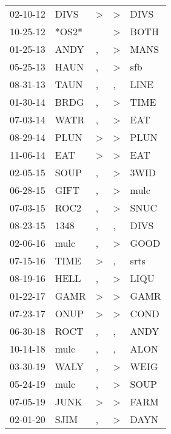 \begin{supertabular}{lllll}
 02-10-12 &   DIVS &  \textgreater &     \textgreater &  DIVS \\
 10-25-12 &  *OS2* &               &     \textgreater &  BOTH \\
 01-25-13 &   ANDY &             , &     \textgreater &  MANS \\
 05-25-13 &   HAUN &             , &     \textgreater &   sfb \\
 08-31-13 &   TAUN &             , &                , &  LINE \\
 01-30-14 &   BRDG &             , &     \textgreater &  TIME \\
 07-03-14 &   WATR &             , &     \textgreater &   EAT \\
 08-29-14 &   PLUN &  \textgreater &     \textgreater &  PLUN \\
 11-06-14 &    EAT &  \textgreater &     \textgreater &   EAT \\
 02-05-15 &   SOUP &             , &     \textgreater &  3WID \\
 06-28-15 &   GIFT &             , &     \textgreater &  mulc \\
 07-03-15 &   ROC2 &             , &     \textgreater &  SNUC \\
 08-23-15 &   1348 &             , &                , &  DIVS \\
 02-06-16 &   mulc &             , &     \textgreater &  GOOD \\
 07-15-16 &   TIME &  \textgreater &                , &  srts \\
 08-19-16 &   HELL &             , &     \textgreater &  LIQU \\
 01-22-17 &   GAMR &  \textgreater &     \textgreater &  GAMR \\
 07-23-17 &   ONUP &  \textgreater &     \textgreater &  COND \\
 06-30-18 &   ROCT &             , &                , &  ANDY \\
 10-14-18 &   mulc &             , &                , &  ALON \\
 03-30-19 &   WALY &             , &     \textgreater &  WEIG \\
 05-24-19 &   mulc &             , &     \textgreater &  SOUP \\
 07-05-19 &   JUNK &  \textgreater &     \textgreater &  FARM \\
 02-01-20 &   SJIM &             , &     \textgreater &  DAYN \\
\end{supertabular}
